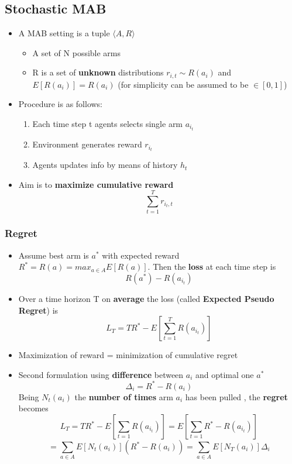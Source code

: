 \documentclass[12pt]{article} %
\begin{document}
\subsection{Stochastic MAB}
\begin{itemize}
\item A MAB setting is a tuple $\langle A,R \rangle$
\begin{itemize}
\item A set of N possible arms
\item R is a set of \textbf{unknown} distributions $r_{i,t}\sim R(a_i)$ and $E[R(a_i)] = R(a_i)$ (for simplicity can be assumed to be $\in [0,1]$)
\end{itemize}
\item Procedure is as follows:
\begin{enumerate}
\item Each time step t	agents selects single arm $a_{i_t}$
\item Environment generates reward $r_{i_t}$
\item Agents updates info by means of history $h_t$
\end{enumerate}
\item Aim is to \textbf{maximize cumulative reward}
$$ \sum_{t=1}^T r_{i_t,t}$$
\end{itemize}

\subsubsection{Regret}
\begin{itemize}
\item Assume best arm is $a^*$ with expected reward $R^*=R(a)=max_{a \in A}E[R(a)]$. Then the \textbf{loss} at each time step is
$$ R(a^*) - R(a_{i_t})$$
\item Over a time horizon T on \textbf{average} the loss (called \textbf{Expected Pseudo Regret}) is 
$$ L_T = TR^* -E[\sum_{t=1}^{T} R(a_{i_t})]$$

\item Maximization of reward = minimization of cumulative regret
\item Second formulation using \textbf{difference} between $a_i$ and optimal one $a^*$ 
$$ \Delta_i = R^* - R(a_i)$$
Being $N_t(a_i)$ the \textbf{number of times} arm $a_i$ has been pulled , the \textbf{regret} becomes 
$$ L_T = TR^* - E[\sum_{t=1} R(a_{i_t})]= E[\sum_{t=1} R^* - R(a_{i_t})]$$
$$ = \sum _{a \in A}E[N_t(a_i)](R^* - R(a_i)) = \sum_{a \in A}E[N_T(a_i)]\Delta_i$$
\end{itemize}
\end{document}
